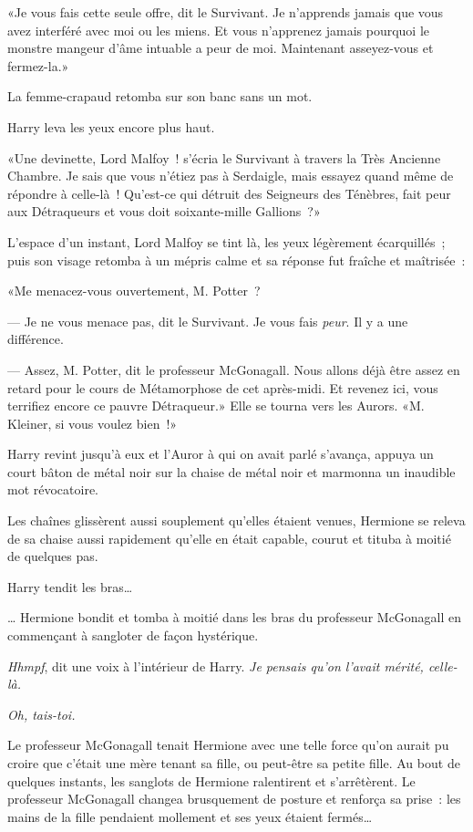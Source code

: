 «Je vous fais cette seule offre, dit le Survivant. Je n'apprends jamais que vous avez interféré avec moi ou les miens. Et vous n'apprenez jamais pourquoi le monstre mangeur d'âme intuable a peur de moi. Maintenant asseyez-vous et fermez-la.»

La femme-crapaud retomba sur son banc sans un mot.

Harry leva les yeux encore plus haut.

«Une devinette, Lord Malfoy~! s'écria le Survivant à travers la Très Ancienne Chambre. Je sais que vous n'étiez pas à Serdaigle, mais essayez quand même de répondre à celle-là~! Qu'est-ce qui détruit des Seigneurs des Ténèbres, fait peur aux Détraqueurs et vous doit soixante-mille Gallions~?»

L'espace d'un instant, Lord Malfoy se tint là, les yeux légèrement écarquillés~; puis son visage retomba à un mépris calme et sa réponse fut fraîche et maîtrisée~:

«Me menacez-vous ouvertement, M. Potter~?

--- Je ne vous menace pas, dit le Survivant. Je vous fais \emph{peur}. Il y a une différence.

--- Assez, M. Potter, dit le professeur McGonagall. Nous allons déjà être assez en retard pour le cours de Métamorphose de cet après-midi. Et revenez ici, vous terrifiez encore ce pauvre Détraqueur.» Elle se tourna vers les Aurors. «M. Kleiner, si vous voulez bien~!»

Harry revint jusqu'à eux et l'Auror à qui on avait parlé s'avança, appuya un court bâton de métal noir sur la chaise de métal noir et marmonna un inaudible mot révocatoire.

Les chaînes glissèrent aussi souplement qu'elles étaient venues, Hermione se releva de sa chaise aussi rapidement qu'elle en était capable, courut et tituba à moitié de quelques pas.

Harry tendit les bras…

… Hermione bondit et tomba à moitié dans les bras du professeur McGonagall en commençant à sangloter de façon hystérique.

\emph{Hhmpf}, dit une voix à l'intérieur de Harry. \emph{Je pensais qu'on l'avait mérité, celle-là.}

\emph{Oh, tais-toi.}

Le professeur McGonagall tenait Hermione avec une telle force qu'on aurait pu croire que c'était une mère tenant sa fille, ou peut-être sa petite fille. Au bout de quelques instants, les sanglots de Hermione ralentirent et s'arrêtèrent. Le professeur McGonagall changea brusquement de posture et renforça sa prise~: les mains de la fille pendaient mollement et ses yeux étaient fermés…

